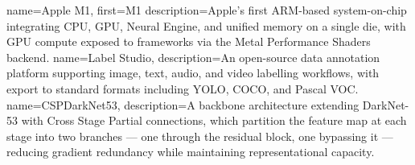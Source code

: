 {
    name={Apple M1},
    first={M1}
    description={Apple's first ARM-based system-on-chip integrating CPU, GPU, Neural Engine, and unified memory on a single die, with GPU compute exposed to frameworks via the Metal Performance Shaders backend.}
}
{
    name={Label Studio},
    description={An open-source data annotation platform supporting image, text, audio, and video labelling workflows, with export to standard formats including YOLO, COCO, and Pascal VOC.}
}
{
    name={CSPDarkNet53},
    description={A backbone architecture extending DarkNet-53 with Cross Stage Partial connections, which partition the feature map at each stage into two branches — one through the residual block, one bypassing it — reducing gradient redundancy while maintaining representational capacity.}
}